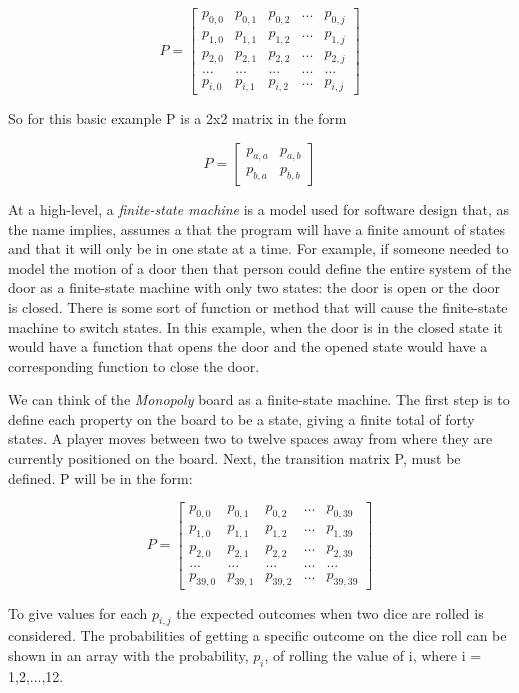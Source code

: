 \documentclass{article}
\begin{document}
$$
P=
\begin{bmatrix}
p_{0,0} & p_{0,1} & p_{0,2} & ... & p_{0,j}\\
p_{1,0} & p_{1,1} & p_{1,2} & ... & p_{1,j}\\
p_{2,0} & p_{2,1} & p_{2,2} & ... & p_{2,j}\\
... & ... & ... & ... & ...\\
p_{i,0} & p_{i,1} & p_{i,2} & ... & p_{i,j}
\end{bmatrix}
$$

So for this basic example P is a 2x2 matrix in the form

$$
P= 
\begin{bmatrix}
p_{a,a}&p_{a,b}\\
p_{b,a}&p_{b,b}
\end{bmatrix}
$$

At a high-level, a \textit{finite-state machine} is a model used for software design that, as the name implies, assumes a that the program will have a finite amount of states and that it will only be in one state at a time. \cite{finitestate} For example, if someone needed to model the motion of a door then that person could define the entire system of the door as a finite-state machine with only two states: the door is open or the door is closed.  There is some sort of function or method that will cause the finite-state machine to switch states.  In this example, when the door is in the closed state it would have a function that opens the door and the opened state would have a corresponding function to close the door.

We can think of the \textit{Monopoly} board as a finite-state machine.  The first step is to define each property on the board to be a state, giving a finite total of forty states.  A player moves between two to twelve spaces away from where they are currently positioned on the board.  Next, the transition matrix P, must be defined.  P will be in the form:

$$
P=
\begin{bmatrix}
p_{0,0} & p_{0,1} & p_{0,2} & ... & p_{0,39}\\
p_{1,0} & p_{1,1} & p_{1,2} & ... & p_{1,39}\\
p_{2,0} & p_{2,1} & p_{2,2} & ... & p_{2,39}\\
... & ... & ... & ... & ...\\
p_{39,0} & p_{39,1} & p_{39,2} & ... & p_{39,39}
\end{bmatrix}
$$

To give values for each $p_{i,j}$  the expected outcomes when two dice are rolled is considered.  The probabilities of getting a specific outcome on the dice roll can be shown in an array with the probability, $p_i$, of rolling the value of i, where i = 1,2,...,12.
\end{document}
